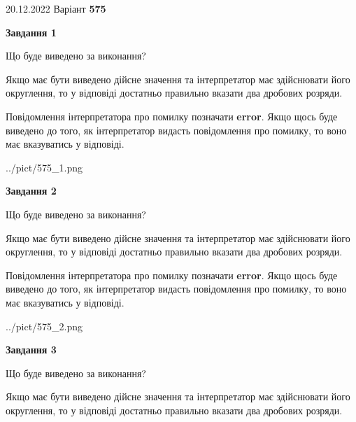 \documentclass[12pt, ukrainian]{article}
\begin{document}
{20.12.2022 Варіант \No \textbf { 575 }\par}
{
\begin {Large}

{\begin {center}\textbf{Завдання 1}\end {center}}\par
Що буде виведено за виконання? \par

Якщо має бути виведено дійсне значення та інтерпретатор має здійснювати його округлення, 
то у відповіді достатньо правильно вказати два дробових розряди.

Повідомлення інтерпретатора про помилку позначати \textbf{error}.
Якщо щось буде виведено до того, як інтерпретатор видасть повідомлення про помилку, 
то воно має вказуватись у відповіді. \par

\begin{center}
	{../pict/575_1.png}
\end{center}
\newpage

{\begin {center}\textbf{Завдання 2}\end {center}}\par
Що буде виведено за виконання? \par

Якщо має бути виведено дійсне значення та інтерпретатор має здійснювати його округлення, 
то у відповіді достатньо правильно вказати два дробових розряди.

Повідомлення інтерпретатора про помилку позначати \textbf{error}.
Якщо щось буде виведено до того, як інтерпретатор видасть повідомлення про помилку, 
то воно має вказуватись у відповіді. \par

\begin{center}
	{../pict/575_2.png}
\end{center}
\newpage

{\begin {center}\textbf{Завдання 3}\end {center}}\par
Що буде виведено за виконання? \par

Якщо має бути виведено дійсне значення та інтерпретатор має здійснювати його округлення, 
то у відповіді достатньо правильно вказати два дробових розряди.


\end{Large}}
\end{document}
